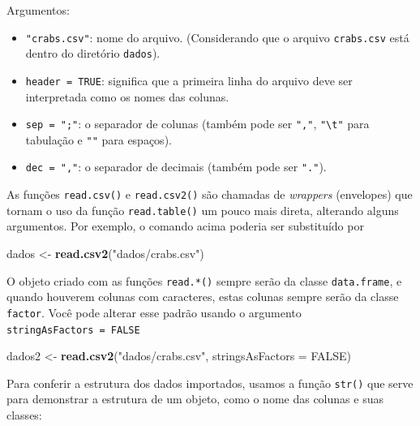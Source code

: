 \documentclass[10pt,a4paper]{book}
\newenvironment{Shaded}{\begin{snugshade}}{\end{snugshade}}
\newcommand{\KeywordTok}[1]{\textcolor[rgb]{0.13,0.29,0.53}{\textbf{#1}}}
\newcommand{\DataTypeTok}[1]{\textcolor[rgb]{0.13,0.29,0.53}{#1}}
\newcommand{\StringTok}[1]{\textcolor[rgb]{0.31,0.60,0.02}{#1}}
\newcommand{\OtherTok}[1]{\textcolor[rgb]{0.56,0.35,0.01}{#1}}
\newcommand{\NormalTok}[1]{#1}
\providecommand{\tightlist}{%
  \setlength{\itemsep}{0pt}\setlength{\parskip}{0pt}}
\begin{document}
Argumentos:

\begin{itemize}
\tightlist
\item
  \texttt{"crabs.csv"}: nome do arquivo. (Considerando que o arquivo
  \texttt{crabs.csv} está dentro do diretório \texttt{dados}).
\item
  \texttt{header\ =\ TRUE}: significa que a primeira linha do arquivo
  deve ser interpretada como os nomes das colunas.
\item
  \texttt{sep\ =\ ";"}: o separador de colunas (também pode ser
  \texttt{","}, \texttt{"\textbackslash{}t"} para tabulação e
  \texttt{""} para espaços).
\item
  \texttt{dec\ =\ ","}: o separador de decimais (também pode ser
  \texttt{"."}).
\end{itemize}

As funções \texttt{read.csv()} e \texttt{read.csv2()} são chamadas de
\emph{wrappers} (envelopes) que tornam o uso da função
\texttt{read.table()} um pouco mais direta, alterando alguns argumentos.
Por exemplo, o comando acima poderia ser substituído por

\begin{Shaded}
\begin{Highlighting}[]
\NormalTok{dados <-}\StringTok{ }\KeywordTok{read.csv2}\NormalTok{(}\StringTok{"dados/crabs.csv"}\NormalTok{)}
\end{Highlighting}
\end{Shaded}

O objeto criado com as funções \texttt{read.*()} sempre serão da classe
\texttt{data.frame}, e quando houverem colunas com caracteres, estas
colunas sempre serão da classe \texttt{factor}. Você pode alterar esse
padrão usando o argumento \texttt{stringAsFactors\ =\ FALSE}

\begin{Shaded}
\begin{Highlighting}[]
\NormalTok{dados2 <-}\StringTok{ }\KeywordTok{read.csv2}\NormalTok{(}\StringTok{"dados/crabs.csv"}\NormalTok{, }\DataTypeTok{stringsAsFactors =} \OtherTok{FALSE}\NormalTok{)}
\end{Highlighting}
\end{Shaded}

Para conferir a estrutura dos dados importados, usamos a função
\texttt{str()} que serve para demonstrar a estrutura de um objeto, como
o nome das colunas e suas classes:
\end{document}

